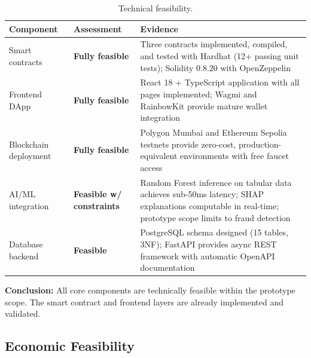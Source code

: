 \documentclass[11pt,a4paper]{article}
\newcommand{\tableheadfont}{\bfseries\small\color{PrimaryBlue}}
\newenvironment{moderntable}[1][H]{%
    \begin{table}[#1]\centering\small%
    \renewcommand{\arraystretch}{1.35}%
}{%
    \end{table}%
}
\begin{document}
\begin{moderntable}
\caption{Technical feasibility.}
\begin{tabular}{@{} >{\raggedright}p{2.5cm} >{\raggedright}p{2.2cm} >{\raggedright\arraybackslash}p{7cm} @{}}
\toprule
\tableheadfont Component & \tableheadfont Assessment & \tableheadfont Evidence \\
\midrule
\rowcolor{RowShade}
Smart contracts & {\color{GreenAccent}\textbf{Fully feasible}} & Three contracts implemented, compiled, and tested with Hardhat (12+ passing unit tests); Solidity 0.8.20 with OpenZeppelin \\
Frontend DApp & {\color{GreenAccent}\textbf{Fully feasible}} & React 18 + TypeScript application with all pages implemented; Wagmi and RainbowKit provide mature wallet integration \\
\rowcolor{RowShade}
Blockchain deployment & {\color{GreenAccent}\textbf{Fully feasible}} & Polygon Mumbai and Ethereum Sepolia testnets provide zero-cost, production-equivalent environments with free faucet access \\
AI/ML integration & {\color{AmberAccent}\textbf{Feasible w/ constraints}} & Random Forest inference on tabular data achieves sub-50ms latency; SHAP explanations computable in real-time; prototype scope limits to fraud detection \\
\rowcolor{RowShade}
Database backend & {\color{GreenAccent}\textbf{Feasible}} & PostgreSQL schema designed (15 tables, 3NF); FastAPI provides async REST framework with automatic OpenAPI documentation \\
\bottomrule
\end{tabular}
\end{moderntable}

\textbf{Conclusion:} All core components are technically feasible within the prototype scope. The smart contract and frontend layers are already implemented and validated.

\subsection{Economic Feasibility}
\end{document}
